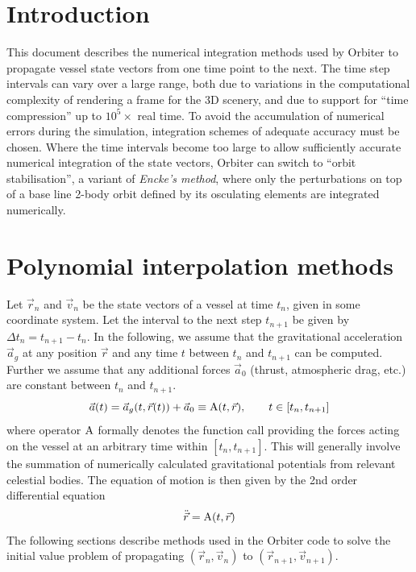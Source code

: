 \documentclass[a4paper]{article}
\begin{document}


\newcommand{\ACC}{\ensuremath\mathrm{A}}
\newcommand{\AACC}{\ensuremath\mathrm{T}}
\newcommand{\Euler}{\ensuremath\mathrm{E}}


\newcommand{\vR}[1]{\ensuremath{\vec{R}_{#1}}}
\newcommand{\nR}[1]{\ensuremath{|\vR{#1}|}}

\maketitle

\section{Introduction}
This document describes the numerical integration methods used by Orbiter to propagate vessel state vectors from one time point to the next. The time step intervals can vary over a large range, both due to variations in the computational complexity of rendering a frame for the 3D scenery, and due to support for ``time compression'' up to $10^5 \times$ real time.
To avoid the accumulation of numerical errors during the simulation, integration schemes of adequate accuracy must be chosen.
Where the time intervals become too large to allow sufficiently accurate numerical integration of the state vectors, Orbiter can switch to ``orbit stabilisation'', a variant of \emph{Encke's method}, where only the perturbations on top of a base line 2-body orbit defined by its osculating elements are integrated numerically.

\section{Polynomial interpolation methods}
Let $\vec{r}_n$ and $\vec{v}_n$ be the state vectors of a vessel at time $t_n$, given in some coordinate system. Let the interval to the next step $t_{n+1}$ be given by $\Delta t_n = t_{n+1}-t_n$.
 In the following, we assume that the gravitational acceleration $\vec{a}_g$ at any position $\vec{r}$ and any time $t$ between $t_n$ and $t_{n+1}$ can be computed. Further we assume that any additional forces $\vec{a}_0$ (thrust, atmospheric drag, etc.) are constant between $t_n$ and $t_{n+1}$.
\begin{equation*}
\vec{a}(t) = \vec{a}_g(t,\vec{r}(t)) + \vec{a}_0 \equiv \ACC(t,\vec{r}),\qquad t \in [t_n, t_{n+1}]
\end{equation*}
where operator $\ACC$ formally denotes the function call providing the forces acting on the vessel at an arbitrary time within $[t_n, t_{n+1}]$.
This will generally involve the summation of numerically calculated gravitational potentials from relevant celestial bodies.
The equation of motion is then given by the 2nd order differential equation
\begin{equation}\label{eq:motion}
\ddot{\vec{r}} = \ACC(t,\vec{r})
\end{equation}
The following sections describe methods used in the Orbiter code to solve the initial value problem of propagating $(\vec{r}_n,\vec{v}_n)$ to $(\vec{r}_{n+1},\vec{v}_{n+1})$.
\end{document}
